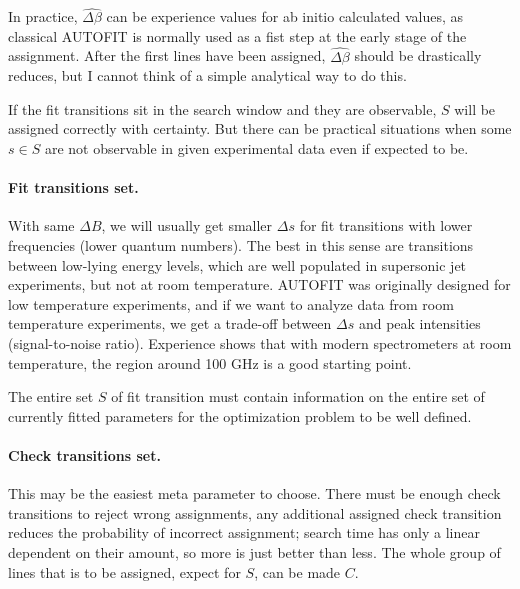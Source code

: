 \documentclass[11pt]{article}
\begin{document}

In practice, $\widehat {\Delta \beta}$ can be experience values for ab initio calculated values, as classical AUTOFIT is normally used as a fist step at the early stage of the assignment. After the first lines have been assigned, $\widehat {\Delta \beta}$ should be drastically reduces, but I cannot think of a simple analytical way to do this.

If the fit transitions sit in the search window and they are observable, $S$ will be assigned correctly with certainty. But there can be practical situations when some $s \in S$ are not observable in given experimental data even if expected to be.

\paragraph{Fit transitions set.}

With same $\Delta B$, we will usually get smaller $\Delta s$ for fit transitions with lower frequencies (lower quantum numbers). The best in this sense are transitions between low-lying energy levels, which are well populated in supersonic jet experiments, but not at room temperature. AUTOFIT was originally designed for low temperature experiments, and if we want to analyze data from room temperature experiments, we get a trade-off between $\Delta s$ and peak intensities (signal-to-noise ratio). Experience shows that with modern spectrometers at room temperature, the region around 100 GHz is a good starting point. 

The entire set $S$ of fit transition must contain information on the entire set of currently fitted parameters for the optimization problem to be well defined.

\paragraph{Check transitions set.}

This may be the easiest meta  parameter to choose. There must be enough check transitions to reject wrong assignments, any additional assigned check transition reduces the probability of incorrect assignment; search time has only a linear dependent on their amount, so more is just better than less. The whole group of lines that is to be assigned, expect for $S$, can be made $C$.
\end{document}
